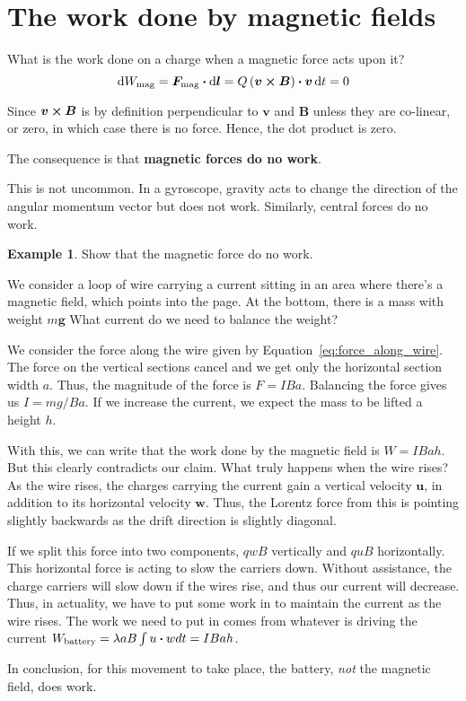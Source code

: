 \documentclass[12pt,chapterprefix=false,dvipsnames]{scrbook}
\theoremstyle{dotless}
\theoremstyle{definition}
\newtheorem{protoexample}{Example}[section]
\newenvironment{example}
{\colorlet{shadecolor}{red!15}\begin{shaded}\begin{protoexample}}
			{\end{protoexample}\end{shaded}}
\begin{document}
\section{The work done by magnetic fields}%
\label{sec:the_work_done_by_magnetic_fields}

What is the work done on a charge when a magnetic force acts
upon it?
\begin{equation}
	\dd{W_{\mathrm{mag}}}
	=
	\bm{F}_{\mathrm{mag}}\vdot
	\dd{\bm{l}}
	=
	Q\left(\bm{v}\cross\bm{B}\right)\vdot\bm{v}
	\dd{t} = 0
\end{equation}

Since $\bm{v}\cross\bm{B}$ is by definition perpendicular to
$\bm{v}$ and $\bm{B}$ unless they
are co-linear, or zero, in which case there is no force. Hence,
the dot product is zero.

The consequence is that \textbf{magnetic forces do no work}.

This is not uncommon. In a gyroscope, gravity acts to change the
direction of the angular momentum vector but does not work.
Similarly, central forces do no work.

\begin{example}
	Show that the magnetic force do no work.

	We consider a loop of wire carrying a current sitting in an area
	where there's a magnetic field, which points into the page. At
	the bottom, there is a mass with weight $m\bm{g}$
	What current do we need to balance the weight?

	We consider the force along the wire given by
	Equation~\ref{eq:force_along_wire}. The force on the vertical
	sections cancel and we get only the horizontal section width
	$a$. Thus, the magnitude of the force is
	$F = IBa$. Balancing the force gives us
	$I = mg/Ba$. If we increase the current, we expect
	the mass to be lifted a height $h$.

	With this, we can write that the work done by the magnetic field
	is $W = IBah$. But this clearly contradicts our
	claim. What truly happens when the wire rises? As the wire
	rises, the charges carrying the current gain a vertical velocity
	$\bm{u}$, in addition to its horizontal velocity
	$\bm{w}$. Thus, the Lorentz force from this is
	pointing slightly backwards as the drift direction is slightly
	diagonal.

	If we split this force into two components,
	$qwB$ vertically and $quB$
	horizontally. This horizontal force is acting to slow the
	carriers down. Without assistance, the charge carriers will slow
	down if the wires rise, and thus our current will decrease.
	Thus, in actuality, we have to put some work in to maintain the
	current as the wire rises. The work we need to put in comes from
	whatever is driving the current $W_\mathrm{battery} = \lambda a B \int u \vdot w dt = IBah$.

	In conclusion, for this movement to take place, the battery,
	\textit{not} the magnetic field, does work.
\end{example}
\end{document}
